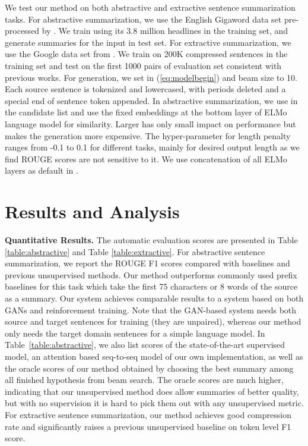 \documentclass[11pt,a4paper]{article}
\begin{document}
We test our method on both abstractive and extractive sentence summarization tasks.
For abstractive summarization, we use the English Gigaword data set pre-processed by \citet{rush2015neural}. 
We train  using its 3.8 million headlines in the training set, and generate summaries for the input in test set.
For extractive summarization, we use the Google data set from \citet{filippova2013overcoming}. We train  on 200K compressed sentences in the training set and test on the first 1000 pairs of evaluation set consistent with previous works.
For generation, we set  in (\ref{eq:modelbegin}) and beam size to 10.
Each source sentence is tokenized and lowercased, with periods deleted and a special end of sentence token appended. In abstractive summarization, we use  in the candidate list and use the fixed embeddings at the bottom layer of ELMo language model for similarity.
Larger  has only small impact on performance but makes the generation more expensive. The hyper-parameter  for length penalty ranges from -0.1 to 0.1 for different tasks, mainly for desired output length as we find ROUGE scores are not sensitive to it.
We use concatenation of all ELMo layers as default in .




\section{Results and Analysis}

\textbf{Quantitative Results.} 
The automatic evaluation scores are presented in Table \ref{table:abstractive} and Table \ref{table:extractive}. 
For abstractive sentence summarization,
we report the ROUGE F1 scores compared with baselines and previous unsupervised methods.
Our method outperforms commonly used prefix baselines for this task which take the first 75 characters or 8 words of the source as a summary. 
Our system achieves comparable results to \citet{wang2018learning} a system based on both GANs and reinforcement training.
Note that the GAN-based system needs both source and target sentences for training (they are unpaired), whereas our method only needs the target domain sentences for a simple language model.
In Table~\ref{table:abstractive}, we also list scores of the state-of-the-art supervised model, an attention based seq-to-seq model of our own implementation,
as well as the oracle scores of our method obtained by choosing the best summary among all finished hypothesis from beam search. The oracle scores are much higher, indicating that our unsupervised method does allow summaries of better quality, but with no supervision it is hard to pick them out with any unsupervised metric.
For extractive sentence summarization, our method achieves good compression rate and significantly raises a previous unsupervised baseline on token level F1 score. 
\end{document}
